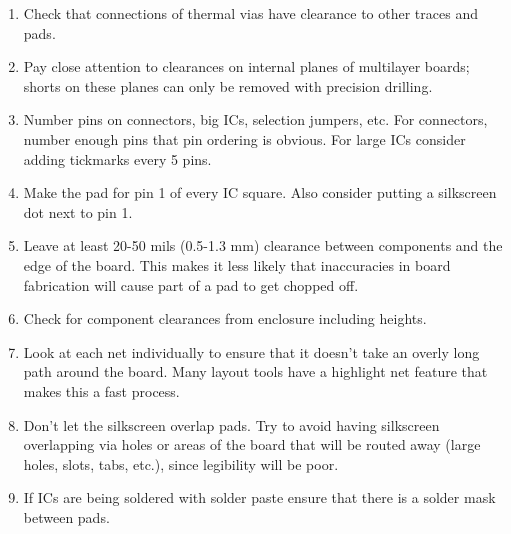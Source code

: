 \begin{enumerate}
\item Check that connections of thermal vias have clearance to other
  traces and pads.

\item Pay close attention to clearances on internal planes of
  multilayer boards; shorts on these planes can only be removed with
  precision drilling.
  
\item Number pins on connectors, big ICs, selection jumpers, etc. For
  connectors, number enough pins that pin ordering is obvious. For
  large ICs consider adding tickmarks every 5 pins.
  
\item Make the pad for pin 1 of every IC square. Also consider putting
  a silkscreen dot next to pin 1.

\item Leave at least 20-50 mils (0.5-1.3 mm) clearance between components and the edge of the board. This makes it less likely that inaccuracies in board fabrication will cause part of a pad to get chopped off.
  
\item Check for component clearances from enclosure including heights.
  
\item Look at each net individually to ensure that it doesn’t take an
  overly long path around the board. Many layout tools have a
  highlight net feature that makes this a fast process.
  
\item Don't let the silkscreen overlap pads. Try to avoid having
  silkscreen overlapping via holes or areas of the board that will be
  routed away (large holes, slots, tabs, etc.), since legibility will
  be poor.
  
\item If ICs are being soldered with solder paste ensure that there is
  a solder mask between pads.
 \end{enumerate}

